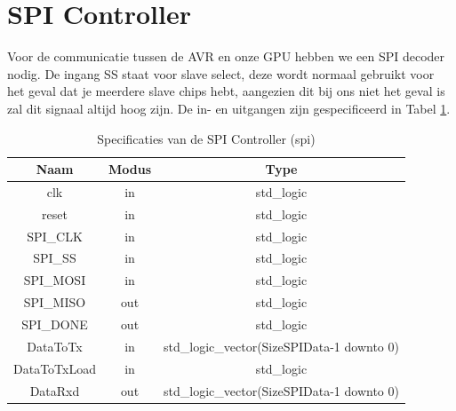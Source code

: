 \documentclass{scrreprt} %
\begin{document}
\section{SPI Controller}
Voor de communicatie tussen de AVR en onze GPU hebben we een SPI decoder nodig.
De ingang SS staat voor slave select, deze wordt normaal gebruikt voor het geval dat je meerdere slave chips hebt, aangezien dit bij ons niet het geval is zal dit signaal altijd hoog zijn.
De in- en uitgangen zijn gespecificeerd in Tabel \ref{tab:spec-spi}.

\begin{table}[H]
\centering
\caption{Specificaties van de SPI Controller (spi)}
\label{tab:spec-spi}
\begin{tabular}{c c c}
	\hline\hline
 	Naam & Modus & Type\\
 	\hline
	clk & in & std\_logic \\
	reset & in & std\_logic \\
	SPI\_CLK & in & std\_logic \\
	SPI\_SS & in & std\_logic \\
	SPI\_MOSI & in & std\_logic \\
	SPI\_MISO & out & std\_logic \\
	SPI\_DONE & out & std\_logic \\
	DataToTx & in & std\_logic\_vector(SizeSPIData-1 downto 0) \\
	DataToTxLoad & in & std\_logic \\
	DataRxd & out & std\_logic\_vector(SizeSPIData-1 downto 0) \\
  	\hline
\end{tabular}
\end{table}
\end{document}
